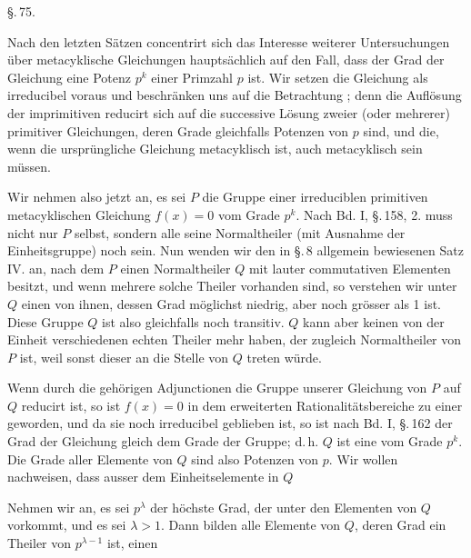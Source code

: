 \begin{center}
\S.\,75.\\
\end{center}

Nach den letzten S\"atzen concentrirt sich das Interesse weiterer Untersuchungen \"uber metacyklische Gleichungen haupts\"achlich auf den Fall, dass der Grad der Gleichung eine Potenz $p^k$ einer Primzahl $p$ ist. Wir setzen die Gleichung als irreducibel voraus und beschr\"anken uns auf die Betrachtung ; denn die Aufl\"osung der imprimitiven reducirt sich auf die successive L\"osung zweier (oder mehrerer) primitiver Gleichungen, deren Grade gleichfalls Potenzen von $p$ sind, und die, wenn die urspr\"ungliche Gleichung metacyklisch ist, auch metacyklisch sein m\"ussen.

Wir nehmen also jetzt an, es sei $P$ die Gruppe einer irreduciblen primitiven metacyklischen Gleichung $f(x) = 0$ vom Grade $p^k$. Nach Bd. I, \S.\,158, 2. muss nicht nur $P$ selbst, sondern alle seine Normaltheiler (mit Ausnahme der Einheitsgruppe) noch  sein. Nun wenden wir den in \S.\,8 allgemein bewiesenen Satz IV. an, nach dem $P$ einen Normaltheiler $Q$ mit lauter commutativen Elementen besitzt, und wenn mehrere solche Theiler vorhanden sind, so verstehen wir unter $Q$ einen von ihnen, dessen Grad m\"oglichst niedrig, aber noch gr\"osser als 1 ist. Diese Gruppe $Q$ ist also gleichfalls noch transitiv. $Q$ kann aber keinen von der Einheit verschiedenen echten Theiler mehr haben, der zugleich Normaltheiler von $P$ ist, weil sonst dieser an die Stelle von $Q$ treten w\"urde.

Wenn durch die geh\"origen Adjunctionen die Gruppe unserer Gleichung von $P$ auf $Q$ reducirt ist, so ist $f(x) = 0$ in dem erweiterten Rationalit\"atsbereiche zu einer  geworden, und da sie noch irreducibel geblieben ist, so ist nach Bd. I, \S.\,162 der Grad der Gleichung gleich dem Grade der Gruppe; d.\,h. $Q$ ist eine  vom Grade $p^k$. Die Grade aller Elemente von $Q$ sind also Potenzen von $p$. Wir wollen nachweisen, dass ausser dem Einheitselemente in $Q$ 

Nehmen wir an, es sei $p^\lambda$ der h\"ochste Grad, der unter den Elementen von $Q$ vorkommt, und es sei $\lambda > 1$. Dann bilden alle Elemente von $Q$, deren Grad ein Theiler von $p^{\lambda-1}$ ist, einen
